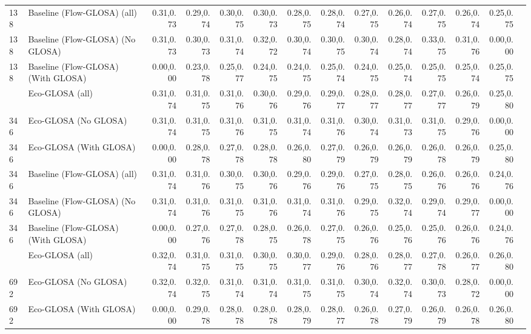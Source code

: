 \begin{table}[ht]
{\begin{tabular}{llrrrrrrrrrrrr}
        138  & Baseline (Flow-GLOSA) (all)        & 0.31,0.73 & 0.29,0.74 & 0.30,0.75 & 0.30,0.73 & 0.28,0.75 & 0.28,0.74 & 0.27,0.75 & 0.26,0.74 & 0.27,0.75 & 0.26,0.74 & 0.25,0.75 \\
        138  & Baseline (Flow-GLOSA) (No GLOSA)   & 0.31,0.73 & 0.30,0.73 & 0.31,0.74 & 0.32,0.72 & 0.30,0.74 & 0.30,0.75 & 0.30,0.74 & 0.28,0.74 & 0.33,0.75 & 0.31,0.76 & 0.00,0.00 \\
        138  & Baseline (Flow-GLOSA) (With GLOSA) & 0.00,0.00 & 0.23,0.78 & 0.25,0.77 & 0.24,0.75 & 0.24,0.75 & 0.25,0.74 & 0.24,0.75 & 0.25,0.74 & 0.25,0.75 & 0.25,0.74 & 0.25,0.75 \\
        \addlinespace
        346  & Eco-GLOSA (all)                    & 0.31,0.74 & 0.31,0.75 & 0.31,0.76 & 0.30,0.76 & 0.29,0.76 & 0.29,0.77 & 0.28,0.77 & 0.28,0.77 & 0.27,0.77 & 0.26,0.79 & 0.25,0.80 \\
        346  & Eco-GLOSA (No GLOSA)               & 0.31,0.74 & 0.31,0.75 & 0.31,0.76 & 0.31,0.75 & 0.31,0.74 & 0.31,0.76 & 0.30,0.74 & 0.31,0.73 & 0.31,0.75 & 0.29,0.76 & 0.00,0.00 \\
        346  & Eco-GLOSA (With GLOSA)             & 0.00,0.00 & 0.28,0.78 & 0.27,0.78 & 0.28,0.78 & 0.26,0.80 & 0.27,0.79 & 0.26,0.79 & 0.26,0.79 & 0.26,0.78 & 0.26,0.79 & 0.25,0.80 \\
        346  & Baseline (Flow-GLOSA) (all)        & 0.31,0.74 & 0.31,0.76 & 0.30,0.75 & 0.30,0.76 & 0.29,0.76 & 0.29,0.76 & 0.27,0.75 & 0.28,0.75 & 0.26,0.76 & 0.26,0.76 & 0.24,0.76 \\
        346  & Baseline (Flow-GLOSA) (No GLOSA)   & 0.31,0.74 & 0.31,0.76 & 0.31,0.75 & 0.31,0.76 & 0.31,0.74 & 0.31,0.76 & 0.29,0.75 & 0.32,0.74 & 0.29,0.74 & 0.29,0.77 & 0.00,0.00 \\
        346  & Baseline (Flow-GLOSA) (With GLOSA) & 0.00,0.00 & 0.27,0.76 & 0.27,0.78 & 0.28,0.75 & 0.26,0.78 & 0.27,0.75 & 0.26,0.76 & 0.25,0.76 & 0.25,0.76 & 0.26,0.76 & 0.24,0.76 \\
        \addlinespace
        692  & Eco-GLOSA (all)                    & 0.32,0.74 & 0.31,0.75 & 0.31,0.75 & 0.30,0.75 & 0.30,0.77 & 0.29,0.76 & 0.28,0.76 & 0.28,0.77 & 0.27,0.78 & 0.26,0.77 & 0.26,0.80 \\
        692  & Eco-GLOSA (No GLOSA)               & 0.32,0.74 & 0.32,0.75 & 0.31,0.74 & 0.31,0.74 & 0.31,0.75 & 0.31,0.75 & 0.30,0.74 & 0.32,0.74 & 0.30,0.73 & 0.28,0.72 & 0.00,0.00 \\
        692  & Eco-GLOSA (With GLOSA)             & 0.00,0.00 & 0.29,0.78 & 0.28,0.78 & 0.28,0.78 & 0.28,0.79 & 0.28,0.77 & 0.26,0.78 & 0.27,0.79 & 0.26,0.79 & 0.26,0.78 & 0.26,0.80 \\

\end{tabular}}
\end{table}
